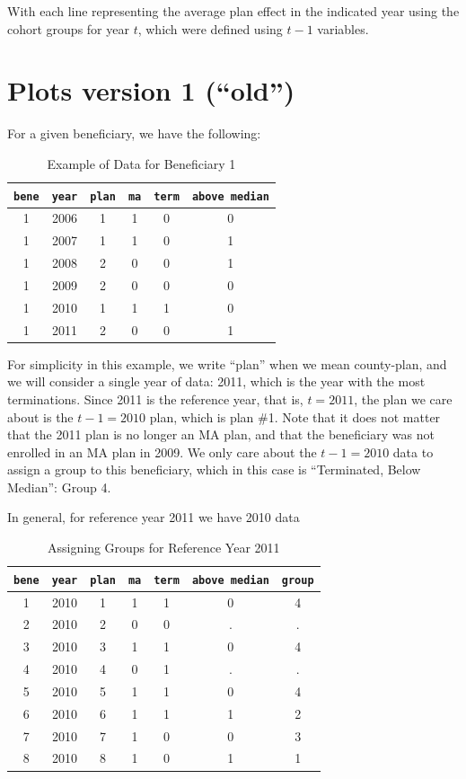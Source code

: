 \documentclass{article}
\begin{document}
With each line representing the average plan effect in the indicated
year using the cohort groups for year $t$, which were defined using $t - 1$
variables.

\section{Plots version 1 (``old'')}
\label{sec:plots_version_1_old_}

For a given beneficiary, we have the following:
\begin{table}[H]
  \centering
  \caption{Example of Data for Beneficiary 1}
  \label{tab:example_of_data_for_beneficiary_1}
  \begin{tabular}{cccccc}
  \toprule
  \verb`bene` & \verb`year` & \verb`plan` & \verb`ma` & \verb`term` & \verb`above median` \\
  \midrule
  1 & 2006 & 1 & 1 & 0 & 0 \\
  1 & 2007 & 1 & 1 & 0 & 1 \\
  1 & 2008 & 2 & 0 & 0 & 1 \\
  1 & 2009 & 2 & 0 & 0 & 0 \\
  1 & 2010 & 1 & 1 & 1 & 0 \\
  1 & 2011 & 2 & 0 & 0 & 1 \\
  \bottomrule
  \end{tabular}
\end{table}

For simplicity in this example, we write ``plan'' when we mean
county-plan, and we will consider a single year of data: 2011, which is
the year with the most terminations. Since 2011 is the reference year,
that is, $t = 2011$, the plan we care about is the $t - 1 = 2010$ plan,
which is plan \#1. Note that it does not matter that the 2011 plan is
no longer an MA plan, and that the beneficiary was not enrolled in an
MA plan in 2009. We only care about the $t - 1 = 2010$ data to assign
a group to this beneficiary, which in this case is ``Terminated, Below
Median'':  Group 4.

In general, for reference year 2011 we have 2010 data
\begin{table}[H]
  \centering
  \caption{Assigning Groups for Reference Year 2011}
  \label{tab:assigning_groups_for_reference_year_2011}
  \begin{tabular}{ccccccc}
  \toprule
  \verb`bene` & \verb`year` & \verb`plan` & \verb`ma` & \verb`term` & \verb`above median` & \verb`group` \\
  \midrule
  1 & 2010 & 1 & 1 & 1 & 0 & 4 \\
  2 & 2010 & 2 & 0 & 0 & . & . \\
  3 & 2010 & 3 & 1 & 1 & 0 & 4 \\
  4 & 2010 & 4 & 0 & 1 & . & . \\
  5 & 2010 & 5 & 1 & 1 & 0 & 4 \\
  6 & 2010 & 6 & 1 & 1 & 1 & 2 \\
  7 & 2010 & 7 & 1 & 0 & 0 & 3 \\
  8 & 2010 & 8 & 1 & 0 & 1 & 1 \\
  \bottomrule
  \end{tabular}
\end{table}
\end{document}
